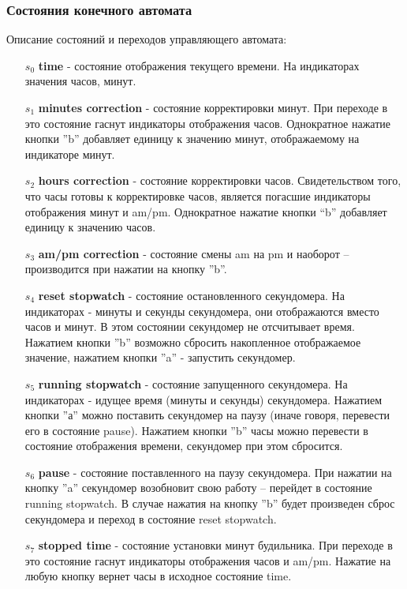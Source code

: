 \documentclass[11pt,a4paper,final]{article} %
\begin{document}
\subsubsection{Состояния конечного автомата}
Описание состояний и переходов управляющего автомата:
\begin{itemize}
	\item[$s_0$] \textbf{time} - состояние отображения текущего времени. На индикаторах значения часов, минут.
	\item[$s_1$] \textbf{minutes correction} - состояние корректировки минут. При переходе в это состояние гаснут индикаторы отображения часов. Однократное нажатие кнопки ''b'' добавляет единицу к значению минут, отображаемому на индикаторе минут.
	\item[$s_2$] \textbf{hours correction} - состояние корректировки часов. Свидетельством того, что часы готовы к корректировке часов, является погасшие индикаторы отображения минут и am/pm. Однократное нажатие кнопки “b” добавляет
	единицу к значению часов.
	\item[$s_3$] \textbf{am/pm correction} -  состояние смены am на pm и наоборот -- производится при нажатии на кнопку ''b''.
	
	\item[$s_4$]\textbf{ reset stopwatch} - состояние остановленного секундомера. На индикаторах - минуты и секунды секундомера, они отображаются вместо часов и минут. В этом состоянии секундомер не отсчитывает время. Нажатием кнопки ''b'' возможно сбросить накопленное отображаемое значение, нажатием кнопки ''a'' - запустить секундомер.
	
	\item[$s_5$] \textbf{running stopwatch} - состояние запущенного секундомера. На индикаторах - идущее время (минуты и секунды) секундомера. Нажатием кнопки ''а'' можно поставить секундомер на паузу (иначе говоря, перевести его в состояние pause). Нажатием кнопки ''b'' часы можно перевести в состояние отображения времени, секундомер при этом сбросится.
	
	\item[$s_6$] \textbf{pause} - состояние поставленного на паузу секундомера. При нажатии на кнопку ''a'' секундомер возобновит свою работу -- перейдет в состояние running stopwatch. В случае нажатия на кнопку ''b'' будет произведен сброс секундомера и переход в состояние reset stopwatch.
	
	\item[$s_7$] \textbf{stopped time} - состояние установки минут будильника. При переходе в это состояние гаснут индикаторы отображения часов и am/pm. Нажатие на любую кнопку вернет часы в исходное состояние time.
\end{itemize}
\end{document}
